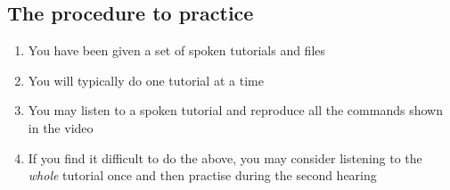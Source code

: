 \documentclass[11pt]{article}
\newenvironment{enumcpt}{\begin{enumerate} \topsep 0pt \partopsep 0pt 
    \parsep 0pt
    \itemsep 0pt \leftmargin -1in \rightmargin 0pt
}{\end{enumerate}}
\begin{document}
\begin{multicols}{2}

  \section{The procedure to practice}
  \begin{enumcpt}
  \item You have been given a set of spoken tutorials and files
  \item You will typically do one tutorial at a time
  \item You may listen to a spoken tutorial and reproduce all the commands shown in the video
  \item If you find it difficult to do the above, you may consider
    listening to the \emph{whole} tutorial once and then practise during
    the second hearing
  \end{enumcpt}


\end{multicols}
\end{document}
